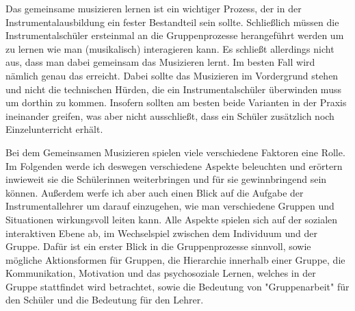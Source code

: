 
Das gemeinsame musizieren lernen ist ein wichtiger Prozess, der in der
Instrumentalausbildung ein fester Bestandteil sein sollte. Schließlich müssen
die Instrumentalschüler ersteinmal an die Gruppenprozesse herangeführt werden um
zu lernen wie man (musikalisch) interagieren kann. Es schließt allerdings nicht
aus, dass man dabei gemeinsam das Musizieren lernt. Im besten Fall wird nämlich
genau das erreicht. Dabei sollte das Musizieren im Vordergrund stehen und nicht
die technischen Hürden, die ein Instrumentalschüler überwinden muss um dorthin
zu kommen. Insofern sollten am besten beide Varianten in der Praxis ineinander
greifen, was aber nicht ausschließt, dass ein Schüler zusätzlich noch
Einzelunterricht erhält.

Bei dem Gemeinsamen Musizieren spielen viele verschiedene Faktoren eine Rolle.
Im Folgenden werde ich deswegen verschiedene Aspekte beleuchten und erörtern
inwieweit sie die Schülerinnen weiterbringen und für sie gewinnbringend sein
können. Außerdem werfe ich aber auch einen Blick auf die Aufgabe der
Instrumentallehrer um darauf einzugehen, wie man verschiedene Gruppen und
Situationen wirkungsvoll leiten kann. Alle Aspekte spielen sich auf der sozialen
interaktiven Ebene ab, im Wechselspiel zwischen dem Individuum und der Gruppe.
Dafür ist ein erster Blick in die Gruppenprozesse sinnvoll, sowie mögliche
Aktionsformen für Gruppen, die Hierarchie innerhalb einer Gruppe, die
Kommunikation, Motivation und das psychosoziale Lernen, welches in der Gruppe
stattfindet wird betrachtet, sowie die Bedeutung von "Gruppenarbeit" für den
Schüler und die Bedeutung für den Lehrer.






























